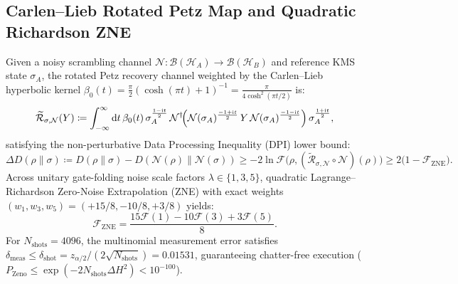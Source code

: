 \documentclass[11pt,a4paper,reqno]{article}
\theoremstyle{plain}
\theoremstyle{definition}
\theoremstyle{remark}
\numberwithin{equation}{section}
\begin{document}
\subsection{Carlen--Lieb Rotated Petz Map and Quadratic Richardson ZNE}
Given a noisy scrambling channel $\mathcal{N} \colon \mathcal{B}(\mathcal{H}_A) \to \mathcal{B}(\mathcal{H}_B)$ and reference KMS state $\sigma_A$, the rotated Petz recovery channel weighted by the Carlen--Lieb hyperbolic kernel $\beta_0(t) = \frac{\pi}{2}(\cosh(\pi t)+1)^{-1} = \frac{\pi}{4\cosh^2(\pi t/2)}$ is:
\begin{equation}
\label{eq:rotated_petz_map}
\widetilde{\mathcal{R}}_{\sigma,\mathcal{N}}(Y) \coloneqq \int_{-\infty}^\infty \mathrm{d}t\,\beta_0(t)\,\sigma_A^{\frac{1-\mathrm{i}t}{2}}\,\mathcal{N}^\dagger\!\Bigl(\mathcal{N}(\sigma_A)^{\frac{-1+\mathrm{i}t}{2}}\, Y\, \mathcal{N}(\sigma_A)^{\frac{-1-\mathrm{i}t}{2}}\Bigr)\,\sigma_A^{\frac{1+\mathrm{i}t}{2}},
\end{equation}
satisfying the non-perturbative Data Processing Inequality (DPI) lower bound:
\begin{equation}
\label{eq:dpi_petz_bound}
\Delta D(\rho \parallel \sigma) \coloneqq D(\rho \parallel \sigma) - D(\mathcal{N}(\rho) \parallel \mathcal{N}(\sigma)) \ge -2\ln\mathcal{F}\bigl(\rho, (\widetilde{\mathcal{R}}_{\sigma,\mathcal{N}}\circ\mathcal{N})(\rho)\bigr) \ge 2\bigl(1 - \mathcal{F}_{\mathrm{ZNE}}\bigr).
\end{equation}
Across unitary gate-folding noise scale factors $\lambda \in \{1, 3, 5\}$, quadratic Lagrange--Richardson Zero-Noise Extrapolation (ZNE) with exact weights $(w_1, w_3, w_5) = (+15/8, -10/8, +3/8)$ yields:
\begin{equation}
\label{eq:richardson_zne_v8}
\mathcal{F}_{\mathrm{ZNE}} = \frac{15\mathcal{F}(1) - 10\mathcal{F}(3) + 3\mathcal{F}(5)}{8}.
\end{equation}
For $N_{\mathrm{shots}} = 4096$, the multinomial measurement error satisfies $\delta_{\mathrm{meas}} \le \delta_{\mathrm{shot}} = z_{\alpha/2}/(2\sqrt{N_{\mathrm{shots}}}) = \bm{0.01531}$, guaranteeing chatter-free execution ($P_{\mathrm{Zeno}} \le \exp(-2 N_{\mathrm{shots}}\Delta H^2) < 10^{-100}$).
\end{document}
